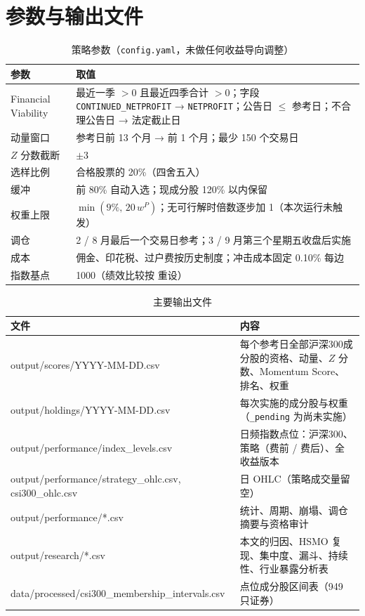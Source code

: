 \documentclass[11pt,a4paper]{article}
\begin{document}
\section{参数与输出文件}
\begin{table}[!htbp]
\centering
\small
\caption{策略参数（\texttt{config.yaml}，未做任何收益导向调整）}\label{tab:params}
\begin{tabular}{@{}p{3.2cm}p{11.8cm}@{}}
\toprule
参数 & 取值 \\
\midrule
Financial Viability & 最近一季 $>0$ 且最近四季合计 $>0$；字段 \texttt{CONTINUED\_NETPROFIT} → \texttt{NETPROFIT}；公告日 $\leq$ 参考日；不合理公告日 → 法定截止日 \\
动量窗口 & 参考日前 13 个月 → 前 1 个月；最少 150 个交易日 \\
$Z$ 分数截断 & $\pm 3$ \\
选样比例 & 合格股票的 20\%（四舍五入） \\
缓冲 & 前 80\% 自动入选；现成分股 120\% 以内保留 \\
权重上限 & $\min(9\%,\,20\,w^P)$；无可行解时倍数逐步加 1（本次运行未触发） \\
调仓 & 2 / 8 月最后一个交易日参考；3 / 9 月第三个星期五收盘后实施 \\
成本 & 佣金、印花税、过户费按历史制度；冲击成本固定 0.10\% 每边 \\
指数基点 & 1000（绩效比较按 \textyen 100 重设） \\
\bottomrule
\end{tabular}
\end{table}

\begin{table}[!htbp]
\centering
\footnotesize
\caption{主要输出文件}\label{tab:files}
\begin{tabular}{@{}p{7.4cm}p{7.6cm}@{}}
\toprule
文件 & 内容 \\
\midrule
output/scores/YYYY-MM-DD.csv & 每个参考日全部沪深300成分股的资格、动量、$Z$ 分数、Momentum Score、排名、权重 \\
output/holdings/YYYY-MM-DD.csv & 每次实施的成分股与权重（\texttt{\_pending} 为尚未实施） \\
output/performance/index\_levels.csv & 日频指数点位：沪深300、策略（费前 / 费后）、全收益版本 \\
output/performance/strategy\_ohlc.csv, csi300\_ohlc.csv & 日 OHLC（策略成交量留空） \\
output/performance/*.csv & 统计、周期、崩塌、调仓摘要与资格审计 \\
output/research/*.csv & 本文的归因、HSMO 复现、集中度、漏斗、持续性、行业暴露分析表 \\
data/processed/csi300\_membership\_intervals.csv & 点位成分股区间表（949 只证券） \\
\bottomrule
\end{tabular}
\end{table}
\end{document}
